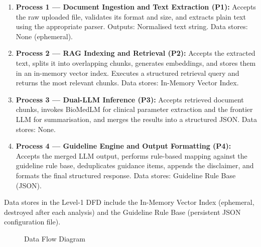 \begin{enumerate}
    \item \textbf{Process 1 --- Document Ingestion and Text Extraction (P1):} Accepts the raw uploaded file, validates its format and size, and extracts plain text using the appropriate parser. Outputs: Normalised text string. Data stores: None (ephemeral).
    \item \textbf{Process 2 --- RAG Indexing and Retrieval (P2):} Accepts the extracted text, splits it into overlapping chunks, generates embeddings, and stores them in an in-memory vector index. Executes a structured retrieval query and returns the most relevant chunks. Data stores: In-Memory Vector Index.
    \item \textbf{Process 3 --- Dual-LLM Inference (P3):} Accepts retrieved document chunks, invokes BioMedLM for clinical parameter extraction and the frontier LLM for summarisation, and merges the results into a structured JSON. Data stores: None.
    \item \textbf{Process 4 --- Guideline Engine and Output Formatting (P4):} Accepts the merged LLM output, performs rule-based mapping against the guideline rule base, deduplicates guidance items, appends the disclaimer, and formats the final structured response. Data stores: Guideline Rule Base (JSON).
\end{enumerate}

Data stores in the Level-1 DFD include the In-Memory Vector Index (ephemeral, destroyed after each analysis) and the Guideline Rule Base (persistent JSON configuration file).

\begin{figure}[h]
    \centering
    \caption{Data Flow Diagram}
\end{figure}

